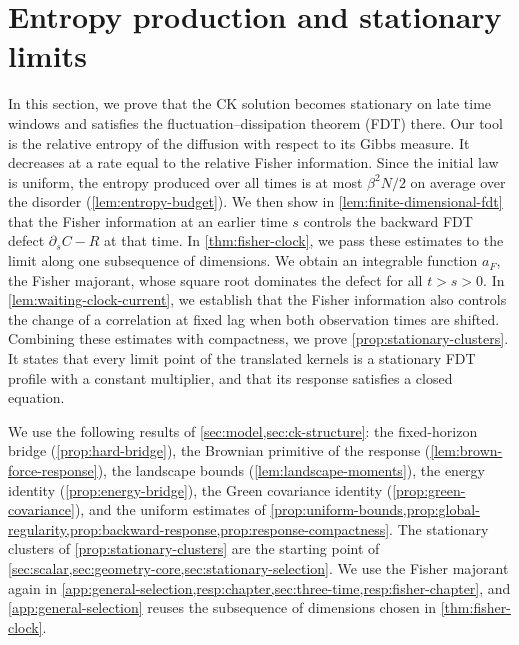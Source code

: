 \chapter{Entropy production and stationary limits}\label{sec:entropy-clusters}

In this section, we prove that the CK solution becomes stationary on late time windows and satisfies the fluctuation--dissipation theorem (FDT) there. Our tool is the relative entropy of the diffusion with respect to its Gibbs measure. It decreases at a rate equal to the relative Fisher information. Since the initial law is uniform, the entropy produced over all times is at most $\beta^2N/2$ on average over the disorder (\cref{lem:entropy-budget}). We then show in \cref{lem:finite-dimensional-fdt} that the Fisher information at an earlier time $s$ controls the backward FDT defect $\partial_sC-R$ at that time. In \cref{thm:fisher-clock}, we pass these estimates to the limit along one subsequence of dimensions. We obtain an integrable function $a_F$, the Fisher majorant, whose square root dominates the defect for all $t>s>0$. In \cref{lem:waiting-clock-current}, we establish that the Fisher information also controls the change of a correlation at fixed lag when both observation times are shifted. Combining these estimates with compactness, we prove \cref{prop:stationary-clusters}. It states that every limit point of the translated kernels is a stationary FDT profile with a constant multiplier, and that its response satisfies a closed equation.

We use the following results of \cref{sec:model,sec:ck-structure}: the fixed-horizon bridge (\cref{prop:hard-bridge}), the Brownian primitive of the response (\cref{lem:brown-force-response}), the landscape bounds (\cref{lem:landscape-moments}), the energy identity (\cref{prop:energy-bridge}), the Green covariance identity (\cref{prop:green-covariance}), and the uniform estimates of \cref{prop:uniform-bounds,prop:global-regularity,prop:backward-response,prop:response-compactness}. The stationary clusters of \cref{prop:stationary-clusters} are the starting point of \cref{sec:scalar,sec:geometry-core,sec:stationary-selection}. We use the Fisher majorant again in \cref{app:general-selection,resp:chapter,sec:three-time,resp:fisher-chapter}, and \cref{app:general-selection} reuses the subsequence of dimensions chosen in \cref{thm:fisher-clock}.

